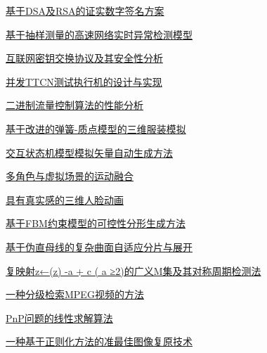 \documentclass[a4paper]{article}
\begin{document}
\href{http://www.jos.org.cn/ch/reader/download_pdf.aspx?file_no=20030339&year_id=2003&quarter_id=3&falg=1}{基于DSA及RSA的证实数字签名方案}

\href{http://www.jos.org.cn/ch/reader/download_pdf.aspx?file_no=20030340&year_id=2003&quarter_id=3&falg=1}{基于抽样测量的高速网络实时异常检测模型}

\href{http://www.jos.org.cn/ch/reader/download_pdf.aspx?file_no=20030341&year_id=2003&quarter_id=3&falg=1}{互联网密钥交换协议及其安全性分析}

\href{http://www.jos.org.cn/ch/reader/download_pdf.aspx?file_no=20030342&year_id=2003&quarter_id=3&falg=1}{并发TTCN测试执行机的设计与实现}

\href{http://www.jos.org.cn/ch/reader/download_pdf.aspx?file_no=20030343&year_id=2003&quarter_id=3&falg=1}{二进制流量控制算法的性能分析}

\href{http://www.jos.org.cn/ch/reader/download_pdf.aspx?file_no=20030344&year_id=2003&quarter_id=3&falg=1}{基于改进的弹簧-质点模型的三维服装模拟}

\href{http://www.jos.org.cn/ch/reader/download_pdf.aspx?file_no=20030345&year_id=2003&quarter_id=3&falg=1}{交互状态机模型模拟矢量自动生成方法}

\href{http://www.jos.org.cn/ch/reader/download_pdf.aspx?file_no=20030346&year_id=2003&quarter_id=3&falg=1}{多角色与虚拟场景的运动融合}

\href{http://www.jos.org.cn/ch/reader/download_pdf.aspx?file_no=20030347&year_id=2003&quarter_id=3&falg=1}{具有真实感的三维人脸动画}

\href{http://www.jos.org.cn/ch/reader/download_pdf.aspx?file_no=20030348&year_id=2003&quarter_id=3&falg=1}{基于FBM约束模型的可控性分形生成方法}

\href{http://www.jos.org.cn/ch/reader/download_pdf.aspx?file_no=20030349&year_id=2003&quarter_id=3&falg=1}{基于伪直母线的复杂曲面自适应分片与展开}

\href{http://www.jos.org.cn/ch/reader/download_pdf.aspx?file_no=20030350&year_id=2003&quarter_id=3&falg=1}{复映射z←(z) -a + c ( a ≥2)的广义M集及其对称周期检测法}

\href{http://www.jos.org.cn/ch/reader/download_pdf.aspx?file_no=20030351&year_id=2003&quarter_id=3&falg=1}{一种分级检索MPEG视频的方法}

\href{http://www.jos.org.cn/ch/reader/download_pdf.aspx?file_no=20030352&year_id=2003&quarter_id=3&falg=1}{PnP问题的线性求解算法}

\href{http://www.jos.org.cn/ch/reader/download_pdf.aspx?file_no=20030353&year_id=2003&quarter_id=3&falg=1}{一种基于正则化方法的准最佳图像复原技术}
\end{document}
